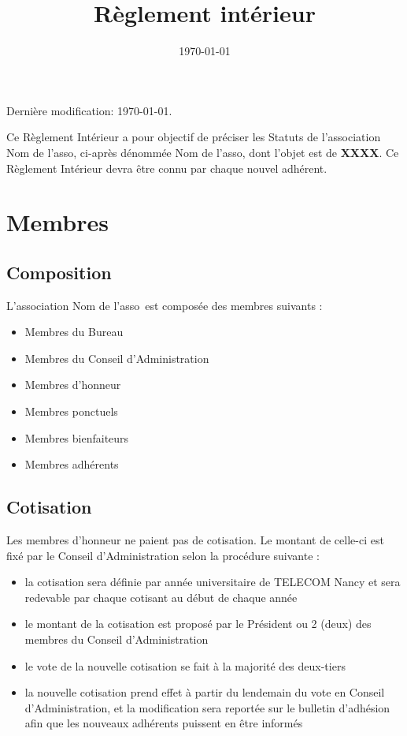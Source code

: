 \documentclass[12pt]{article}
\title{Règlement intérieur \asso}
\author{}
\date{\today}
\newcommand{\asso}{Nom de l'asso}
\begin{document}
\maketitle

\vspace*{10cm}

Dernière modification: \today.

Ce Règlement Intérieur a pour objectif de préciser les Statuts de l’association \asso, ci-après dénommée
\asso, dont l’objet est de \textbf{XXXX}. Ce Règlement Intérieur
devra être connu par chaque nouvel adhérent.

\section{Membres}
\label{sec:membres}

\subsection{Composition}
\label{sec:membres:composition}

L’association \asso~est composée des membres suivants :
\begin{itemize}
    \item Membres du Bureau
    \item Membres du Conseil d’Administration
    \item Membres d’honneur
    \item Membres ponctuels
    \item Membres bienfaiteurs
    \item Membres adhérents
\end{itemize}

\subsection{Cotisation}
\label{sec:membres:cotisation}

Les membres d’honneur ne paient pas de cotisation.
Le montant de celle-ci est fixé par le Conseil d’Administration selon la procédure suivante :
\begin{itemize}
	\item la cotisation sera définie par année universitaire de TELECOM Nancy et sera redevable par chaque
    cotisant au début de chaque année
	\item le montant de la cotisation est proposé par le Président ou 2 (deux) des membres du Conseil
d’Administration
	\item le vote de la nouvelle cotisation se fait à la majorité des deux-tiers
	\item la nouvelle cotisation prend effet à partir du lendemain du vote en Conseil d’Administration, et la
modification sera reportée sur le bulletin d’adhésion afin que les nouveaux adhérents puissent en être
informés
\end{itemize}
\end{document}
